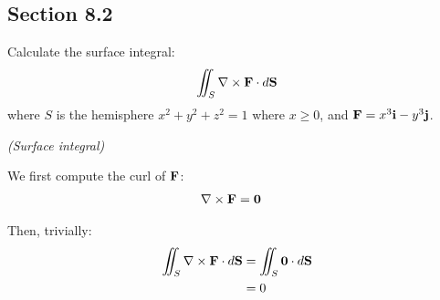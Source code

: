 \subsection{Section 8.2}

\begin{tcolorbox}[
        title={Problem 17},
        valign=center,
        nobeforeafter,
        colframe=gray!95!black
    ]
    Calculate the surface integral:
    \begin{align}
        \iint_S \nabla \times \vb{F} \cdot d\vb{S}
    \end{align}
    where \(S\) is the hemisphere \(x^2 + y^2 + z^2 = 1\) where \(x \geq 0\), and \(\vb{F} = x^3 \vb{i} - y^3 \vb{j}\).
\end{tcolorbox}

\begin{solution}
    \textit{(Surface integral)}
    
    We first compute the curl of \(\vb{F}\):
    \begin{align*}
        \nabla \times \vb{F} &= \vb{0}
    \end{align*}
    
    Then, trivially:
    \begin{align*}
        \iint_S \nabla \times \vb{F} \cdot d\vb{S} &= \iint_S \vb{0} \cdot d\vb{S} \\
        &= 0
    \end{align*}
\end{solution}

